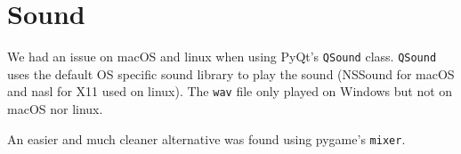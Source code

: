 \section{Sound}

We had an issue on macOS and linux when using PyQt's \texttt{QSound} class.
\texttt{QSound} uses the default OS specific sound library to play the sound
(NSSound for macOS and \gls{nasl} for X11 used on linux). The \texttt{wav} file
only played on Windows but not on macOS nor linux.

An easier and much cleaner alternative was found using pygame's \texttt{mixer}.

